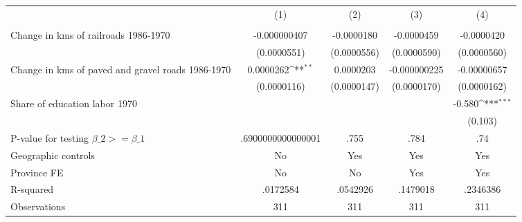 {
\def\sym#1{\ifmmode^{#1}\else\(^{#1}\)\fi}
\begin{tabular}{l*{4}{c}}
\hline\hline
                &\multicolumn{1}{c}{(1)}&\multicolumn{1}{c}{(2)}&\multicolumn{1}{c}{(3)}&\multicolumn{1}{c}{(4)}\\
                &\multicolumn{1}{c}{}&\multicolumn{1}{c}{}&\multicolumn{1}{c}{}&\multicolumn{1}{c}{}\\
\hline
Change in kms of railroads 1986-1970&-0.000000407         &-0.0000180         &-0.0000459         &-0.0000420         \\
                &(0.0000551)         &(0.0000556)         &(0.0000590)         &(0.0000560)         \\
[1em]
Change in kms of paved and gravel roads 1986-1970&0.0000262\sym{**} &0.0000203         &-0.000000225         &-0.00000657         \\
                &(0.0000116)         &(0.0000147)         &(0.0000170)         &(0.0000162)         \\
[1em]
Share of education labor 1970&                  &                  &                  &   -0.580\sym{***}\\
                &                  &                  &                  &  (0.103)         \\
\hline
P-value for testing $\beta\_{2} >= \beta\_{1}$&.6900000000000001         &     .755         &     .784         &      .74         \\
Geographic controls&       No         &      Yes         &      Yes         &      Yes         \\
Province FE     &       No         &       No         &      Yes         &      Yes         \\
R-squared       & .0172584         & .0542926         & .1479018         & .2346386         \\
Observations    &      311         &      311         &      311         &      311         \\
\hline\hline
\end{tabular}
}
